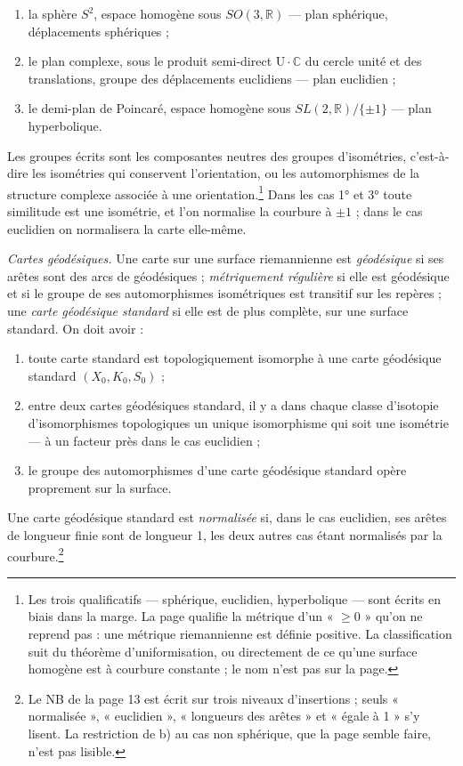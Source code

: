 \documentclass[11pt,a4paper]{article}
\begin{document}
\begin{enumerate}
\item[1°)] la sphère $S^{2}$, espace homogène sous $SO(3, \mathbb{R})$ ---
plan sphérique, déplacements sphériques ;
\item[2°)] le plan complexe, sous le produit semi-direct
$\mathrm{U} \cdot \mathbb{C}$ du cercle unité et des translations, groupe des
déplacements euclidiens --- plan euclidien ;
\item[3°)] le demi-plan de Poincaré, espace homogène sous
$SL(2, \mathbb{R})/\{\pm 1\}$ --- plan hyperbolique.
\end{enumerate}

Les groupes écrits sont les composantes neutres des groupes d'isométries,
c'est-à-dire les isométries qui conservent l'orientation, ou les
automorphismes de la structure complexe associée à une
orientation.\footnote{Les trois qualificatifs --- sphérique, euclidien,
hyperbolique --- sont écrits en biais dans la marge. La page qualifie la
métrique d'un « $\geq 0$ » qu'on ne reprend pas : une métrique riemannienne est
définie positive. La classification suit du théorème d'uniformisation, ou
directement de ce qu'une surface homogène est à courbure constante ; le nom
n'est pas sur la page.} Dans les cas 1° et 3° toute similitude est une
isométrie, et l'on normalise la courbure à $\pm 1$ ; dans le cas euclidien
on normalisera la carte elle-même.

\emph{Cartes géodésiques.} Une carte sur une surface riemannienne est
\emph{géodésique} si ses arêtes sont des arcs de géodésiques ;
\emph{métriquement régulière} si elle est géodésique et si le groupe de ses
automorphismes isométriques est transitif sur les repères ; une \emph{carte
géodésique standard} si elle est de plus complète, sur une surface standard.
On doit avoir :

\begin{enumerate}
\item[a)] toute carte standard est topologiquement isomorphe à une carte
géodésique standard $(X_{0}, K_{0}, S_{0})$ ;
\item[b)] entre deux cartes géodésiques standard, il y a dans chaque classe
d'isotopie d'isomorphismes topologiques un unique isomorphisme qui soit une
isométrie --- à un facteur près dans le cas euclidien ;
\item[c)] le groupe des automorphismes d'une carte géodésique standard opère
proprement sur la surface.
\end{enumerate}

Une carte géodésique standard est \emph{normalisée} si, dans le cas euclidien,
ses arêtes de longueur finie sont de longueur 1, les deux autres cas étant
normalisés par la courbure.\footnote{Le NB de la page 13 est écrit sur trois
niveaux d'insertions ; seuls « normalisée », « euclidien », « longueurs des
arêtes » et « égale à 1 » s'y lisent. La restriction de b) au cas non
sphérique, que la page semble faire, n'est pas lisible.}
\end{document}
